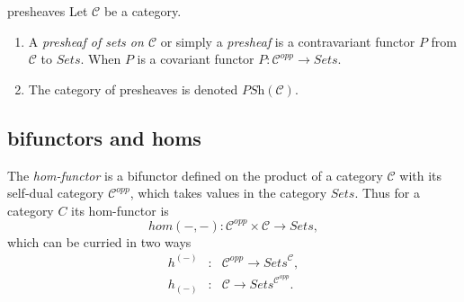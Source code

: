\begin{frame}
\begin{block}{presheaves}
Let $\mathcal{C}$ be a category.
\begin{enumerate}
\item A {\it presheaf of sets on $\mathcal{C}$}
or simply a {\it presheaf} is a contravariant functor
$P$ from $\mathcal{C}$ to $\textit{Sets}$. When $P$ is a covariant functor $P : \mathcal{C}^{opp} \rightarrow \textit{Sets}$.
\item The category of presheaves is denoted $\textit{PSh}(\mathcal{C})$.
\end{enumerate}
\end{block}
\end{frame}

\subsection{bifunctors and homs}


\begin{frame}
\iftoggle{thmsty}{
\begin{definition}
\label{definition-hom-functor}
}{}
The {\it hom-functor} is a bifunctor defined on the product of a category $\mathcal{C}$ with its self-dual category $\mathcal{C}^{opp}$, which takes values in the category $\textit{Sets}$. Thus for a category $C$ its hom-functor is 
$$
hom(-,-): \mathcal{C}^{opp} \times \mathcal{C} \rightarrow \textit{Sets},
$$
which can be curried in two ways
\begin{eqnarray*}
h^{(-)} &:& \mathcal{C}^{opp} \rightarrow \textit{Sets}^{\mathcal{C}},\\
h_{(-)} &:& \mathcal{C} \rightarrow \textit{Sets}^{\mathcal{C}^{opp}}.
\end{eqnarray*}
\end{frame}

